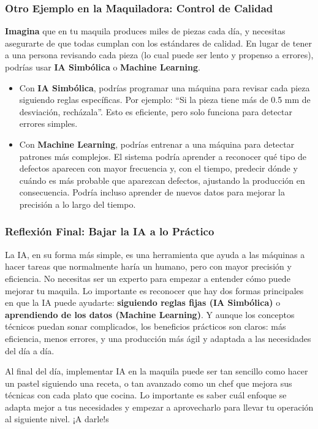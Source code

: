 \documentclass[
  10pt,
  letterpaper,
]{book}
\begin{document}
\subsubsection{Otro Ejemplo en la Maquiladora: Control de
Calidad}\label{otro-ejemplo-en-la-maquiladora-control-de-calidad}

\textbf{Imagina} que en tu maquila produces miles de piezas cada día, y
necesitas asegurarte de que todas cumplan con los estándares de calidad.
En lugar de tener a una persona revisando cada pieza (lo cual puede ser
lento y propenso a errores), podrías usar \textbf{IA Simbólica} o
\textbf{Machine Learning}.

\begin{itemize}
\item
  Con \textbf{IA Simbólica}, podrías programar una máquina para revisar
  cada pieza siguiendo reglas específicas. Por ejemplo: ``Si la pieza
  tiene más de 0.5 mm de desviación, recházala''. Esto es eficiente,
  pero solo funciona para detectar errores simples.
\item
  Con \textbf{Machine Learning}, podrías entrenar a una máquina para
  detectar patrones más complejos. El sistema podría aprender a
  reconocer qué tipo de defectos aparecen con mayor frecuencia y, con el
  tiempo, predecir dónde y cuándo es más probable que aparezcan
  defectos, ajustando la producción en consecuencia. Podría incluso
  aprender de nuevos datos para mejorar la precisión a lo largo del
  tiempo.
\end{itemize}

\subsubsection{Reflexión Final: Bajar la IA a lo
Práctico}\label{reflexiuxf3n-final-bajar-la-ia-a-lo-pruxe1ctico}

La IA, en su forma más simple, es una herramienta que ayuda a las
máquinas a hacer tareas que normalmente haría un humano, pero con mayor
precisión y eficiencia. No necesitas ser un experto para empezar a
entender cómo puede mejorar tu maquila. Lo importante es reconocer que
hay dos formas principales en que la IA puede ayudarte:
\textbf{siguiendo reglas fijas (IA Simbólica)} o \textbf{aprendiendo de
los datos (Machine Learning)}. Y aunque los conceptos técnicos puedan
sonar complicados, los beneficios prácticos son claros: más eficiencia,
menos errores, y una producción más ágil y adaptada a las necesidades
del día a día.

Al final del día, implementar IA en la maquila puede ser tan sencillo
como hacer un pastel siguiendo una receta, o tan avanzado como un chef
que mejora sus técnicas con cada plato que cocina. Lo importante es
saber cuál enfoque se adapta mejor a tus necesidades y empezar a
aprovecharlo para llevar tu operación al siguiente nivel. ¡A darle!s
\end{document}
